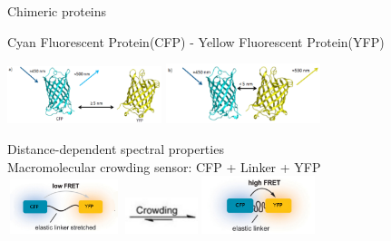 \documentclass{beamer}
\def\Put(#1,#2)#3{\leavevmode\makebox(0,0){\put(#1,#2){#3}}}
\begin{document}
\begin{frame}[plain]{Chimeric proteins}



Cyan Fluorescent Protein(CFP) - Yellow Fluorescent Protein(YFP)\\
 \begin{adjustwidth}{-1.5em}{-3.5em}
 \includegraphics[width=170px]{../img/fretDomainsA.png}
 \includegraphics[width=170px]{../img/fretDomainsB.png}
\end{adjustwidth}
Distance-dependent spectral properties\\
  \vspace{10px}
Macromolecular crowding sensor:  CFP + Linker + YFP \\
\vspace{10px}
\includegraphics[width=125px,height=60px]{../img/fretSeparadosCFP.png}
\includegraphics[width=80px]{../img/crowdingSign.png}
\includegraphics[width=125px]{../img/fretJuntosCFP.png}
\end{frame}
\end{document}

